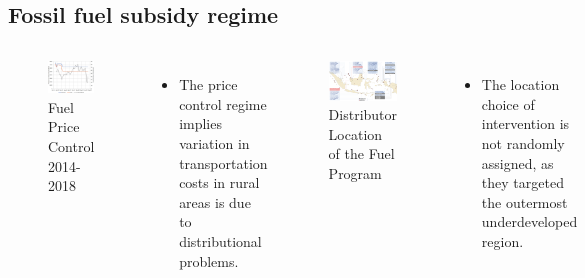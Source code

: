 \documentclass[
11pt,notheorems,compress,hyperref={pdfauthor=Maghfira Ramadhani}
]{beamer}
\begin{document}
\subsection{Fossil fuel subsidy regime}
\begin{frame}
    \begin{columns}[T,onlytextwidth]
      \begin{figure}[t]
        \includegraphics[scale=0.52]{Final_Project/image/bbm-price-2014-2018.jpg}
        \caption{Fuel Price Control 2014-2018}
        \label{f:graph1}
        \end{figure}
        \begin{itemize}
            \item The price control regime implies variation in transportation costs in rural areas is due to distributional problems.
        \end{itemize}
        \begin{figure}[t]
        \includegraphics[scale=0.305]{Final_Project/image/BBM Satu Harga.png}
        \caption{Distributor Location of the Fuel Program}
        \label{f:graph3}
        \end{figure}
        \begin{itemize}
            \item The location choice of intervention is not randomly assigned, as they targeted the outermost underdeveloped region.
        \end{itemize}
    \end{columns}
\end{frame}
\end{document}
